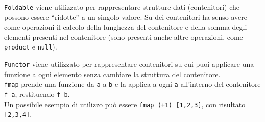 \documentclass{article}
\begin{document}
\texttt{Foldable} viene utilizzato per rappresentare strutture dati (contenitori) che possono essere “ridotte” a un singolo valore. Su dei contenitori ha senso avere come operazioni il calcolo della lunghezza del contenitore e della somma degli elementi presenti nel contenitore (sono presenti anche altre operazioni, come \texttt{product} e \texttt{null}).

\texttt{Functor} viene utilizzato per rappresentare contenitori su cui puoi applicare una funzione a ogni elemento senza cambiare la struttura del contenitore.\\
\texttt{fmap} prende una funzione da \texttt{a} a \texttt{b} e la applica a ogni \texttt{a} all'interno del contenitore \texttt{f a}, restituendo \texttt{f b}.\\
Un possibile esempio di utilizzo può essere \texttt{fmap (+1) [1,2,3]}, con risultato \texttt{[2,3,4]}.
\end{document}
